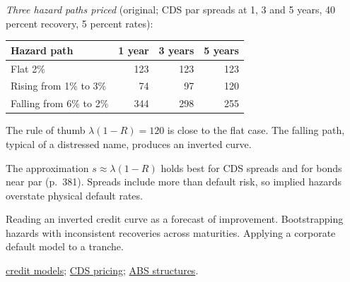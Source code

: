 \begin{qfmethod}
\emph{Three hazard paths priced} (original; CDS par spreads at 1, 3 and 5 years, 40 percent recovery, 5 percent rates):
\begin{center}\small
\begin{tabular}{@{}lrrr@{}}
\toprule
Hazard path & 1 year & 3 years & 5 years \\
\midrule
Flat 2\% & 123 & 123 & 123 \\
Rising from 1\% to 3\% & 74 & 97 & 120 \\
Falling from 6\% to 2\% & 344 & 298 & 255 \\
\bottomrule
\end{tabular}
\end{center}
The rule of thumb $\lambda(1-R)=120$ is close to the flat case. The falling path, typical of a distressed name, produces an inverted curve.

 The approximation $s\approx\lambda(1-R)$ holds best for CDS spreads and for bonds near par (p.~381). Spreads include more than default risk, so implied hazards overstate physical default rates.

 Reading an inverted credit curve as a forecast of improvement. Bootstrapping hazards with inconsistent recoveries across maturities. Applying a corporate default model to a tranche.

 \hyperref[mod:structural-reduced-form-credit]{credit models}; \hyperref[meth:cds-pricing]{CDS pricing}; \hyperref[meth:abs-structures-credit-enhancement]{ABS structures}.

\end{qfmethod}
